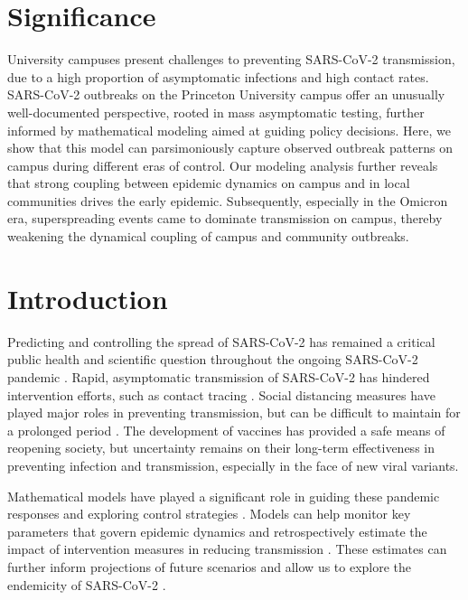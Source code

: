 \documentclass[12pt]{article}
\begin{document}
\section*{Significance}

University campuses present challenges to preventing SARS-CoV-2 transmission, due to a high proportion of asymptomatic infections and high contact rates. SARS-CoV-2 outbreaks on the Princeton University campus offer an unusually well-documented perspective, rooted in mass asymptomatic testing, further informed by mathematical modeling aimed at guiding policy decisions. Here, we show that this model can parsimoniously capture observed outbreak patterns on campus during different eras of control. Our modeling analysis further reveals that strong coupling between epidemic dynamics on campus and in local communities drives the early epidemic. 
Subsequently, especially in the Omicron era, superspreading events came to dominate transmission on campus, thereby weakening the dynamical coupling of campus and community outbreaks.

\pagebreak

\section*{Introduction}

Predicting and controlling the spread of SARS-CoV-2 has remained a critical public health and scientific question throughout the ongoing SARS-CoV-2 pandemic \citep{baker2021limits}.
Rapid, asymptomatic transmission of SARS-CoV-2 has hindered intervention efforts, such as contact tracing \citep{hellewell2020feasibility}.
Social distancing measures have played major roles in preventing transmission, but can be difficult to maintain for a prolonged period \citep{galanti2021social}.
The development of vaccines has provided a safe means of reopening society, but uncertainty remains on their long-term effectiveness in preventing infection and transmission, especially in the face of new viral variants.

Mathematical models have played a significant role in guiding these pandemic responses and exploring control strategies \citep{cobey2020modeling,holmdahl2020wrong,metcalf2020mathematical,koelle2022changing}.
Models can help monitor key parameters that govern epidemic dynamics \citep{kraemer2021monitoring} and retrospectively estimate the impact of intervention measures in reducing transmission \citep{flaxman2020estimating}.
These estimates can further inform projections of future scenarios and allow us to explore the endemicity of SARS-CoV-2 \citep{kissler2020projecting,saad2020immune,lavine2021immunological,saad2021epidemiological}.
\end{document}
